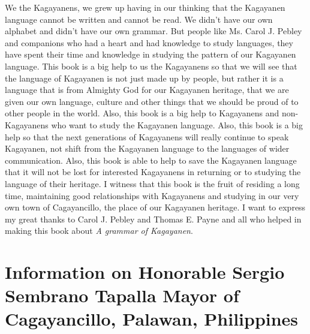 We the Kagayanens, we grew up having in our thinking that the Kagayanen language cannot be written and cannot be read. We didn't have our own alphabet and didn't have our own grammar. But people like Ms. Carol J. Pebley and companions who had a heart and had knowledge to study languages, they have spent their time and knowledge in studying the pattern of our Kagayanen language. This book is a big help to us the Kagayanens so that we will see that the language of Kagayanen is not just made up by people, but rather it is a language that is from Almighty God for our Kagayanen heritage, that we are given our own language, culture and other things that we should be proud of to other people in the world. Also, this book is a big help to Kagayanens and non-Kagayanens who want to study the Kagayanen language. Also, this book is a big help so that the next generations of Kagayanens will really continue to speak Kagayanen, not shift from the Kagayanen language to the languages of wider communication. Also, this book is able to help to save the Kagayanen language that it will not be lost for interested Kagayanens in returning or to studying the language of their heritage. I witness that this book is the fruit of residing a long time, maintaining good relationships with Kagayanens and studying in our very own town of Cagayancillo, the place of our Kagayanen heritage. I want to express my great thanks to Carol J. Pebley and Thomas E. Payne and all who helped in making this book about \textit{A grammar of Kagayanen}.

\section*{Information on Honorable Sergio Sembrano Tapalla Mayor of Cagayancillo, Palawan, Philippines}


